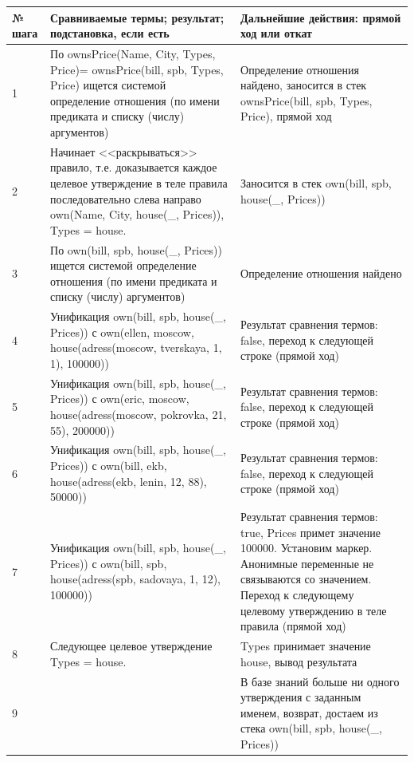 \documentclass[a4paper,14pt]{extreport} %
\begin{document}
\begin{longtable}{|p{1.1cm}|p{8.5cm}|p{7cm}|}
	\hline
 	№ шага & Сравниваемые термы; результат; подстановка, если есть  & Дальнейшие действия: прямой ход или откат \\ \hline
	1 & По ownsPrice(Name, City, Types, Price)= ownsPrice(bill, spb, Types, Price) ищется системой определение отношения (по имени предиката и списку (числу) аргументов) & Определение отношения найдено, заносится в стек ownsPrice(bill, spb, Types, Price), прямой ход \\ \hline
	2 & Начинает <<раскрываться>> правило, т.е. доказывается каждое целевое утверждение в теле правила последовательно слева направо
	own(Name, City, house(\_, Prices)), Types = house.
	
	& Заносится в стек own(bill, spb, house(\_, Prices))\\ \hline

	3 & По own(bill, spb, house(\_, Prices))  ищется системой определение отношения (по имени предиката и списку (числу) аргументов) & Определение отношения найдено \\ \hline
	4 & Унификация own(bill, spb, house(\_, Prices)) с own(ellen, moscow, house(adress(moscow, tverskaya, 1, 1), 100000)) & Результат сравнения термов: false, переход к следующей строке (прямой ход) \\ \hline
	5 & Унификация own(bill, spb, house(\_, Prices)) с own(eric, moscow, house(adress(moscow, pokrovka, 21, 55), 200000)) & Результат сравнения термов: false, переход к следующей строке (прямой ход) \\ \hline
	6 & Унификация own(bill, spb, house(\_, Prices)) с own(bill, ekb, house(adress(ekb, lenin, 12, 88), 50000)) & Результат сравнения термов: false, переход к следующей строке (прямой ход) \\ \hline
	7 & Унификация own(bill, spb, house(\_, Prices)) с own(bill, spb, house(adress(spb, sadovaya, 1, 12), 100000)) & Результат сравнения термов: true, Prices примет значение 100000. Установим маркер. Анонимные переменные не связываются со значением. Переход к следующему целевому утверждению в теле правила (прямой ход) \\ \hline
	8 & Следующее целевое утверждение Types = house.  & Types принимает значение house, вывод результата \\ \hline
	9 &  &  В базе знаний больше ни одного утверждения с заданным именем, возврат, достаем из стека own(bill, spb, house(\_, Prices)) \\ \hline
	

\end{longtable}
\end{document}
